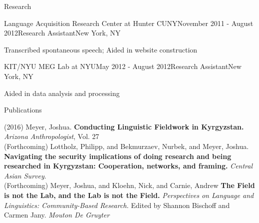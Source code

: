 \documentclass{resume} %
\begin{document}
\begin{rSection}{Research}
\begin{rSubsection}{Language Acquisition Research Center at Hunter CUNY}{November 2011 - August 2012}{Research Assistant}{New York, NY}
\item Transcribed spontaneous speech; Aided in website construction
\end{rSubsection}

\begin{rSubsection}{KIT/NYU MEG Lab at NYU}{May 2012 - August 2012}{Research Assistant}{New York, NY}
\item Aided in data analysis and processing
\end{rSubsection}


\end{rSection}





\begin{minipage}{\textwidth}

  \begin{rSection}{Publications}
    \vspace{.25cm}

{(2016)} {Meyer, Joshua.} {\bf Conducting Linguistic Fieldwork in Kyrgyzstan.} {\textit{Arizona Anthropologist}, Vol. 27} \\

{(Forthcoming)} {Lottholz, Philipp, and Bekmurzaev, Nurbek, and Meyer, Joshua.} {\textbf{Navigating the security implications of doing research and being researched in Kyrgyzstan: Cooperation, networks, and framing.}} {\textit{Central Asian Survey}.}\\

{(Forthcoming)} {Meyer, Joshua, and Kloehn, Nick, and Carnie, Andrew} {\bf The Field is not the Lab, and the Lab is not the Field.} {\it Perspectives on Language and Linguistics: Community-Based Research.} {Edited by Shannon Bischoff and Carmen Jany.} {\textit{Mouton De Gruyter}} \\

\end{rSection}

\end{minipage}
\end{document}
